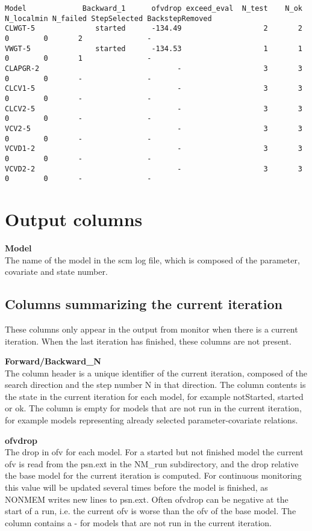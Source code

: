 \documentclass[hideglossary,notoc,hidelof,hidelot,hideTheSignaturePage,hideLinkCurrent,hideloa,pdfLatex,noClient,notitle,hideConfidential]{PMXstyle-20190820}
\begin{document}
{\begin{verbatim}
Model             Backward_1      ofvdrop exceed_eval  N_test    N_ok N_localmin N_failed StepSelected BackstepRemoved
CLWGT-5              started      -134.49                   2       2          0        0       2               -
VWGT-5               started      -134.53                   1       1          0        0       1               -
CLAPGR-2                                -                   3       3          0        0       -               -
CLCV1-5                                 -                   3       3          0        0       -               -
CLCV2-5                                 -                   3       3          0        0       -               -
VCV2-5                                  -                   3       3          0        0       -               -
VCVD1-2                                 -                   3       3          0        0       -               -
VCVD2-2                                 -                   3       3          0        0       -               -

\end{verbatim}
}

\section{Output columns}
{\bfseries Model}\\
The name of the model in the scm log file, which is composed of the parameter, covariate and state number.

\subsection{Columns summarizing the current iteration}
These columns only appear in the output from monitor when there is a current iteration. 
When the last iteration has finished, these columns are not present.

{\bfseries Forward/Backward\_N} \\
The column header is a unique identifier of the current iteration, composed of the search direction and the step number N in that direction. The column contents is the state in the current iteration 
for each model, for example notStarted, started or ok. 
The column is empty for models that are not run in the current iteration, for example models
representing already selected parameter-covariate relations.

{\bfseries ofvdrop}\\
The drop in ofv for each model. For a started but not finished model the current ofv is read from 
the psn.ext in the NM\_run subdirectory, and the drop relative the base model for the current iteration
is computed. For continuous monitoring this value will be updated several
times before the model is finished, as NONMEM writes new lines to psn.ext. 
Often ofvdrop can be negative at the start of a run, i.e. the current ofv is 
worse than the ofv of the base model. 
The column contains a - for models that are not run in the current iteration.
\end{document}
